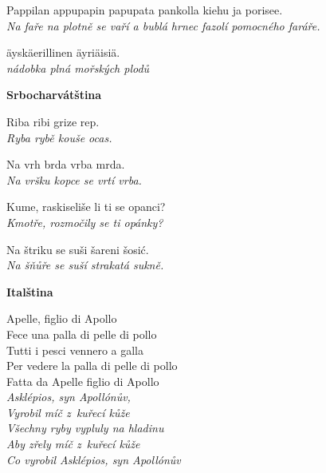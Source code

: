 \medskip

\noindent
Pappilan appupapin papupata pankolla kiehu ja porisee.\\
\textit{Na faře na plotně se vaří a bublá hrnec fazolí pomocného faráře.}

\medskip

\noindent
äyskäerillinen äyriäisiä.\\
\textit{nádobka plná mořských plodů}

\medskip


\bigskip

\noindent
\textbf{Srbocharvátština}

\medskip

\noindent
Riba ribi grize rep. \\
\textit{Ryba rybě kouše ocas.}

\medskip

\noindent
Na vrh brda vrba mrda. \\
\textit{Na vršku kopce se vrtí vrba.}

\medskip

\noindent
Kume, raskiseliše li ti se opanci? \\
\textit{Kmotře, rozmočily se ti opánky?}

\medskip

\noindent
Na štriku se suši šareni šosić. \\
\textit{Na šňůře se suší strakatá sukně.}

\medskip



\bigskip

\noindent
\textbf{Italština}

\medskip

\noindent
Apelle, figlio di Apollo \\
Fece una palla di pelle di pollo \\
Tutti i pesci vennero a galla \\
Per vedere la palla di pelle di pollo \\
Fatta da Apelle figlio di Apollo \\
\textit{Asklépios, syn Apollónův, \\ Vyrobil míč z kuřecí kůže \\ Všechny ryby vypluly na hladinu \\ Aby zřely míč z kuřecí kůže \\ Co vyrobil Asklépios, syn Apollónův}

